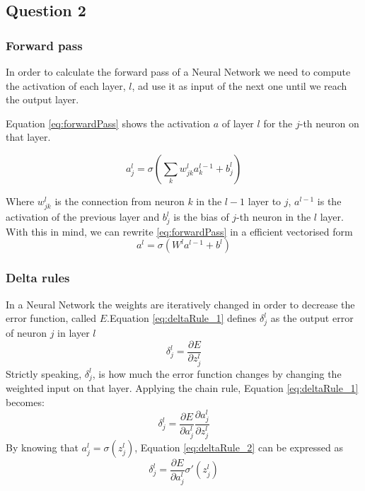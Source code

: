 \documentclass[11pt]{article}
\begin{document}
\subsection{Question 2}
\subsubsection{Forward pass}
In order to calculate the forward pass of a Neural Network we need to compute the activation of each layer, $l$, ad use it as input of the next one until we reach the output layer. 

Equation \ref{eq:forwardPass} shows the activation $a$ of layer $l$ for the $j$-th neuron on that layer.

\begin{equation}
\label{eq:forwardPass}
a^l_j = \sigma(\sum_k w^l_{jk}a^{l-1}_k + b^l_j)
\end{equation}

Where $w^l_{jk}$ is the connection from neuron $k$ in the $l-1$ layer to $j$, $a^{l-1}$ is the activation of the previous layer and $b^l_j$ is the bias of $j$-th neuron in the $l$ layer. With this in mind, we can rewrite \ref{eq:forwardPass} in a efficient vectorised form
\begin{equation}
\label{eq:forwardPassVectorized}
a^l = \sigma(W^la^{l-1} + b^l)
\end{equation}

\subsubsection{Delta rules}
In a Neural Network the weights are iteratively changed in order to decrease the error function, called $E$.Equation \ref{eq:deltaRule_1} defines $\delta^l_j$ as the output error of neuron $j$ in layer $l$
\begin{equation}
	\label{eq: deltaRule_1}
	\delta^l_j = \frac{\partial E}{\partial z^l_j}
\end{equation}
Strictly speaking, $\delta^l_j$, is how much the error function changes by changing the weighted input on that layer. Applying the chain rule, Equation \ref{eq:deltaRule_1} becomes:
\begin{equation}
\label{eq:deltaRule_2}
\delta^l_j = \frac{\partial E}{\partial a^l_j} \frac{\partial a^l_j}{\partial z^l_j}
\end{equation}
By knowing that $a^l_j = \sigma(z^l_j)$, Equation \ref{eq:deltaRule_2} can be expressed as
\begin{equation}
\label{eq:deltaRule}	
\delta^l_j = \frac{\partial E}{\partial a^l_j} \sigma'(z^l_j)
\end{equation}  
\end{document}

